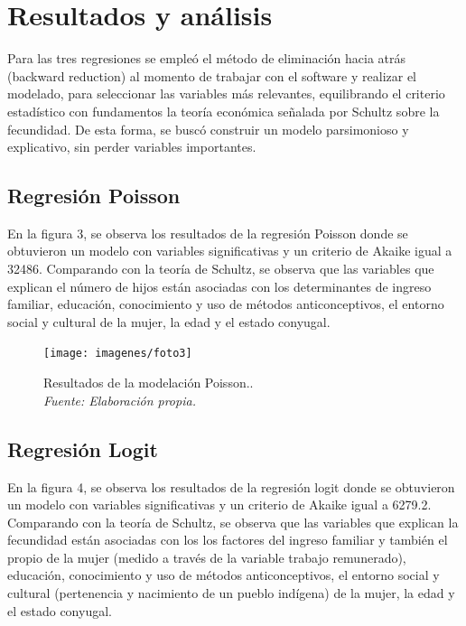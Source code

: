 \documentclass[Royal,times,sageh]{sagej}
\begin{document}
\section{Resultados y análisis}\label{resultados-y-anuxe1lisis}

Para las tres regresiones se empleó el método de eliminación hacia atrás
(backward reduction) al momento de trabajar con el software y realizar
el modelado, para seleccionar las variables más relevantes, equilibrando
el criterio estadístico con fundamentos la teoría económica señalada por
Schultz sobre la fecundidad. De esta forma, se buscó construir un modelo
parsimonioso y explicativo, sin perder variables importantes.

\subsection{Regresión Poisson}\label{regresiuxf3n-poisson-2}

En la figura 3, se observa los resultados de la regresión Poisson donde
se obtuvieron un modelo con variables significativas y un criterio de
Akaike igual a 32486. Comparando con la teoría de Schultz, se observa
que las variables que explican el número de hijos están asociadas con
los determinantes de ingreso familiar, educación, conocimiento y uso de
métodos anticonceptivos, el entorno social y cultural de la mujer, la
edad y el estado conyugal.

\begin{figure}

{\centering \texttt{[image: imagenes/foto3]} 

}

\caption{Resultados de la modelación Poisson..\\\textit{Fuente: Elaboración propia.}}\label{fig:unnamed-chunk-3}
\end{figure}

\subsection{Regresión Logit}\label{regresiuxf3n-logit-1}

En la figura 4, se observa los resultados de la regresión logit donde se
obtuvieron un modelo con variables significativas y un criterio de
Akaike igual a 6279.2. Comparando con la teoría de Schultz, se observa
que las variables que explican la fecundidad están asociadas con los los
factores del ingreso familiar y también el propio de la mujer (medido a
través de la variable trabajo remunerado), educación, conocimiento y uso
de métodos anticonceptivos, el entorno social y cultural (pertenencia y
nacimiento de un pueblo indígena) de la mujer, la edad y el estado
conyugal.
\end{document}
